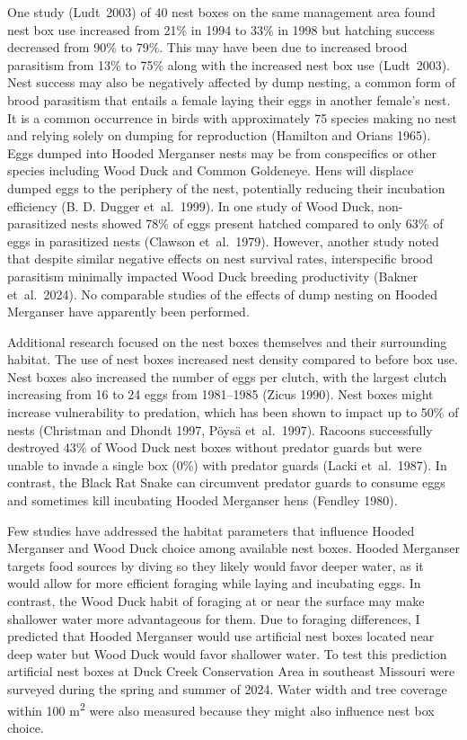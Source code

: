 One study (Ludt~2003) of 40 nest boxes on the same management area found nest box use increased from 21\% in 1994 to 33\% in 1998 but hatching success decreased from 90\% to 79\%. This may have been due to increased brood parasitism from 13\% to 75\% along with the increased nest box use (Ludt~2003). Nest success may also be negatively affected by dump nesting, a common form of brood parasitism that entails a female laying their eggs in another female’s nest. It is a common occurrence in birds with approximately 75 species making no nest and relying solely on dumping for reproduction (Hamilton and Orians 1965). Eggs dumped into Hooded Merganser nests may be from conspecifics or other species including Wood Duck and Common Goldeneye. Hens will displace dumped eggs to the periphery of the nest, potentially reducing their incubation efficiency (B. D. Dugger et~al.~1999).  In one study of Wood Duck, non-parasitized nests showed 78\% of eggs present hatched compared to only 63\% of eggs in parasitized nests (Clawson et~al.~1979). However, another study noted that despite similar negative effects on nest survival rates, interspecific brood parasitism minimally impacted Wood Duck breeding productivity (Bakner et~al.~2024). No comparable studies of the effects of dump nesting on Hooded Merganser have apparently been performed.

Additional research focused on the nest boxes themselves and their surrounding habitat. The use of nest boxes increased nest density compared to before box use. Nest boxes also increased the number of eggs per clutch, with the largest clutch increasing from 16 to 24 eggs from 1981–1985 (Zicus 1990).  Nest boxes might increase vulnerability to predation, which has been shown to impact up to 50\% of nests (Christman and Dhondt 1997, Pöysä et~al.~1997). Racoons successfully destroyed 43\% of Wood Duck nest boxes without predator guards but were unable to invade a single box (0\%) with predator guards (Lacki et~al.~1987). In contrast, the Black Rat Snake can circumvent predator guards to consume eggs and sometimes kill incubating Hooded Merganser hens (Fendley 1980).  


Few studies have addressed the habitat parameters that influence Hooded Merganser and Wood Duck choice among available nest boxes.  Hooded Merganser targets food sources by diving so they likely would favor deeper water, as it would allow for more efficient foraging while laying and incubating eggs. In contrast, the Wood Duck habit of foraging at or near the surface may make shallower water more advantageous for them. Due to foraging differences, I predicted that Hooded Merganser would use artificial nest boxes located near deep water but Wood Duck would favor shallower water. To test this prediction artificial nest boxes at Duck Creek Conservation Area in southeast Missouri were surveyed during the spring and summer of 2024.  Water width and tree coverage within 100 m\textsuperscript{2} were also measured because they might also influence nest box choice. 

